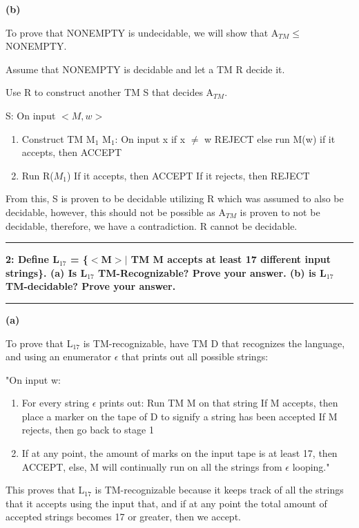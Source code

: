 \documentclass[11pt]{article}
\newcommand\question[2]{\vspace{.25in}\hrule\textbf{#1: #2}\vspace{.5em}\hrule\vspace{.10in}}
\renewcommand\part[1]{\vspace{.10in}\textbf{(#1)}\par}
\begin{document}
	\part{b}
		To prove that NONEMPTY is undecidable, we will show that A$_{TM} \le$ NONEMPTY.\par
		Assume that NONEMPTY is decidable and let a TM R decide it.\par
		Use R to construct another TM S that decides A$_{TM}$.\par
		\quad S: On input $<M, w>$\par
			\begin{enumerate}
				\item Construct TM M$_{1}$
					\subitem M$_{1}$: On input x
						\subsubitem if x $\ne$ w REJECT
						\subsubitem else run M(w)
						\subsubitem \quad if it accepts, then ACCEPT
				\item Run R($M_{1}$)
					\subitem If it accepts, then ACCEPT
					\subitem If it rejects, then REJECT
			\end{enumerate}\par
		From this, S is proven to be decidable utilizing R which was assumed to also be decidable, however, this should not be possible as A$_{TM}$ is proven to not be decidable, therefore, we have a contradiction. R cannot be decidable.\par
		
\question{2}{Define L$_{17}$ = \{$<$M$>|$ TM M accepts at least 17 different input strings\}. (a) Is L$_{17}$ TM-Recognizable? Prove your answer. (b) is L$_{17}$ TM-decidable? Prove your answer.}

	\part{a}
		To prove that L$_{17}$ is TM-recognizable, have TM D that recognizes the language, and using an enumerator $\epsilon$ that prints out all possible strings:\par
		"On input w:\par
		\begin{enumerate}
			\item For every string $\epsilon$ prints out:
				\subitem Run TM M on that string
				\subitem If M accepts, then place a marker on the tape of D to signify a string has been accepted
				\subitem If M rejects, then go back to stage 1
			\item If at any point, the amount of marks on the input tape is at least 17, then ACCEPT, else, M will continually run on all the strings from $\epsilon$ looping."
		\end{enumerate}\par
		This proves that L$_{17}$ is TM-recognizable because it keeps track of all the strings that it accepts using the input that, and if at any point the total amount of accepted strings becomes 17 or greater, then we accept. 
	
\end{document}
